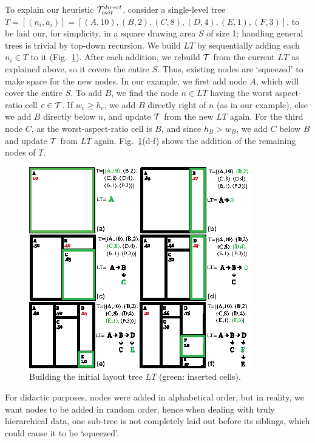 To explain our heuristic ${\cal T}_{init}^{direct}$, consider a single-level tree $T = [(n_i,a_i)]  =  [ (A, 10), (B, 2), (C, 8), (D, 4), (E, 1), (F, 3) ]$, to be laid our, for simplicity, in a square drawing area $S$ of size 1; handling general trees is trivial by top-down recursion. We build $LT$ by sequentially adding each $n_i \in T$ to it (Fig.~\ref{fig:git_example}). After each addition, we rebuild ${\cal T}$ from the current $LT$ as explained above, so it covers the entire $S$. Thus, existing nodes are `squeezed' to make space for the new nodes. In our example, we first add node $A$, which will cover the entire $S$. To add $B$, we find the node $n \in LT$ having the worst aspect-ratio cell $c \in {\cal T}$. If $w_c \geq h_c$, we add $B$ directly right of $n$ (as in our example), else we add $B$ directly below $n$, and update ${\cal T}$ from the new $LT$ again. For the third node $C$, as the worst-aspect-ratio cell is $B$, and since $h_B > w_B$, we add $C$ below $B$ and update ${\cal T}$ from $LT$ again. Fig.~\ref{fig:git_example}(d-f) shows the addition of the remaining nodes of $T$.\\

\begin{figure}[htbp!]
\centering
\includegraphics[width=.9\textwidth]{figures/treemap-algorithm/git_example.eps}
\caption{Building the initial layout tree $LT$ (green: inserted cells).}
\label{fig:git_example}
\end{figure}

For didactic purposes, nodes were added in alphabetical order, but in reality, we want nodes to be added in random order, hence when dealing with truly hierarchical data, one sub-tree is not completely laid out before its siblings, which could cause it to be `squeezed'.\\

